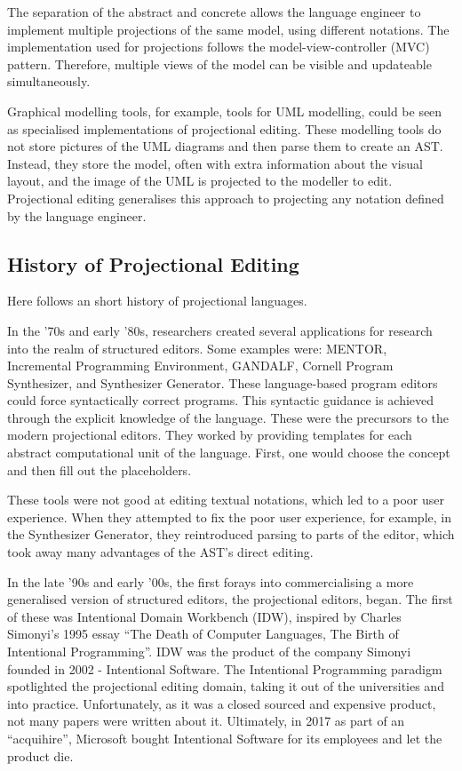 The separation of the abstract and concrete allows the language engineer to implement multiple projections of the same model, using different notations.
The implementation used for projections follows the model-view-controller (MVC) pattern.
Therefore, multiple views of the model can be visible and updateable simultaneously.

Graphical modelling tools, for example, tools for UML modelling, could be seen as specialised implementations of projectional editing.
These modelling tools do not store pictures of the UML diagrams and then parse them to create an AST.
Instead, they store the model, often with extra information about the visual layout, and the image of the UML is projected to the modeller to edit.
Projectional editing generalises this approach to projecting any notation defined by the language engineer.

\subsection{History of Projectional Editing}

Here follows an short history of projectional languages.

In the '70s and early '80s, researchers created several applications for research into the realm of structured editors.
Some examples were: MENTOR\cite{donzeau1980programming}, Incremental Programming Environment\cite{medina1981incremental}, GANDALF\cite{NotkinDavid1985TGp}, Cornell Program Synthesizer\cite{teitelbaum1981cornell}, and Synthesizer Generator\cite{reps2012synthesizer}.
These language-based program editors could force syntactically correct programs. 
This syntactic guidance is achieved through the explicit knowledge of the language. 
These were the precursors to the modern projectional editors. 
They worked by providing templates for each abstract computational unit of the language.
First, one would choose the concept and then fill out the placeholders.

These tools were not good at editing textual notations, which led to a poor user experience.
When they attempted to fix the poor user experience, for example, in the Synthesizer Generator, they reintroduced parsing to parts of the editor, which took away many advantages of the AST's direct editing.

In the late '90s and early '00s, the first forays into commercialising a more generalised version of structured editors, the projectional editors, began.
The first of these was Intentional Domain Workbench (IDW), inspired by Charles Simonyi's 1995 essay ``The Death of Computer Languages, The Birth of Intentional Programming''\cite{simonyi1995death}.
IDW was the product of the company Simonyi founded in 2002 - Intentional Software. 
The Intentional Programming paradigm spotlighted the projectional editing domain, taking it out of the universities and into practice.
Unfortunately, as it was a closed sourced and expensive product, not many papers were written about it.
Ultimately, in 2017 as part of an ``acquihire'', Microsoft bought Intentional Software for its employees and let the product die.

